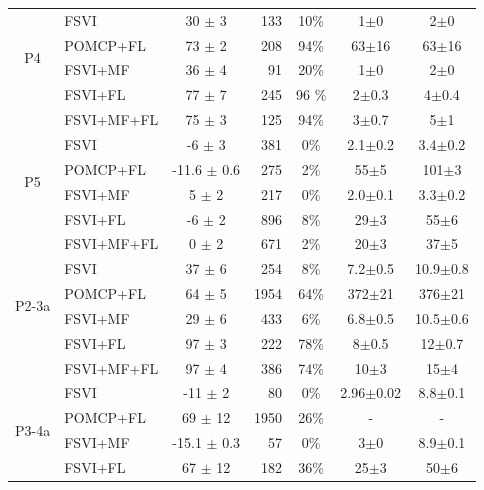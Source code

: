 \documentclass[letterpaper]{article} %
\newcommand{\itay}[1]{}
\begin{document}
\begin{table}
{\begin{tabular}{ |c|l|c|r|c|c|c| }
    \multirow{4}{*}{P4}      
    & FSVI\itay{+} & 30 $\pm$ 3 & 133 & 10\% & 1$\pm$0 & 2$\pm$0 \\
    & POMCP+FL\itay{+} & 73 $\pm$ 2 & 208 & 94\% & 63$\pm$16 & 63$\pm$16 \\
    & FSVI+MF\itay{+} & 36 $\pm$ 4 & 91 & 20\% & 1$\pm$0 & 2$\pm$0 \\
    &FSVI+FL\itay{+} & 77 $\pm$ 7 & 245 & 96 \% & 2$\pm$0.3 & 4$\pm$0.4 \\
    & FSVI+MF+FL\itay{+} & 75 $\pm$ 3 & 125 & 94\% & 3$\pm$0.7 & 5$\pm$1 \\
    \hline\hline
    \multirow{4}{*}{P5}      
    & FSVI\itay{+} & -6 $\pm$ 3 & 381 & 0\% & 2.1$\pm$0.2 & 3.4$\pm$0.2 \\
    & POMCP+FL\itay{+} & -11.6 $\pm$ 0.6 & 275 & 2\% & 55$\pm$5 & 101$\pm$3 \\
    & FSVI+MF\itay{+} & 5 $\pm$ 2 & 217 & 0\% & 2.0$\pm$0.1 & 3.3$\pm$0.2 \\
    &FSVI+FL\itay{+} & -6 $\pm$ 2 & 896 & 8\% & 29$\pm$3 & 55$\pm$6 \\
    & FSVI+MF+FL\itay{+} & 0 $\pm$ 2 & 671 & 2\% & 20$\pm$3 & 37$\pm$5 \\
    \hline\hline
    \multirow{4}{*}{P2-3a}
    & FSVI\itay{+} & 37 $\pm$ 6 & 254 & 8\% &  7.2$\pm$0.5 & 10.9$\pm$0.8 \\
    & POMCP+FL\itay{+} & 64 $\pm$ 5 & 1954 & 64\% &  372$\pm$21 & 376$\pm$21 \\
    & FSVI+MF\itay{+} & 29 $\pm$ 6 & 433 & 6\% &  6.8$\pm$0.5 & 10.5$\pm$0.6 \\
    &FSVI+FL\itay{+} & 97 $\pm$ 3 & 222 & 78\% &  8$\pm$0.5 & 12$\pm$0.7 \\ 
    & FSVI+MF+FL\itay{+} & 97 $\pm$ 4 & 386 & 74\% &  10$\pm$3 & 15$\pm$4 \\
    \hline\hline
    \multirow{4}{*}{P3-4a}
    & FSVI\itay{+} & -11 $\pm$ 2 & 80 & 0\% &  2.96$\pm$0.02 & 8.8$\pm$0.1 \\
    & POMCP+FL\itay{-} & 69 $\pm$ 12 & 1950 & 26\% &  - & - \\
    & FSVI+MF\itay{+} & -15.1 $\pm$ 0.3 & 57 & 0\% &  3$\pm$0 & 8.9$\pm$0.1 \\
    &FSVI+FL\itay{+} & 67 $\pm$ 12 & 182 & 36\% &  25$\pm$3 & 50$\pm$6 \\

\end{tabular}}
\end{table}
\end{document}
